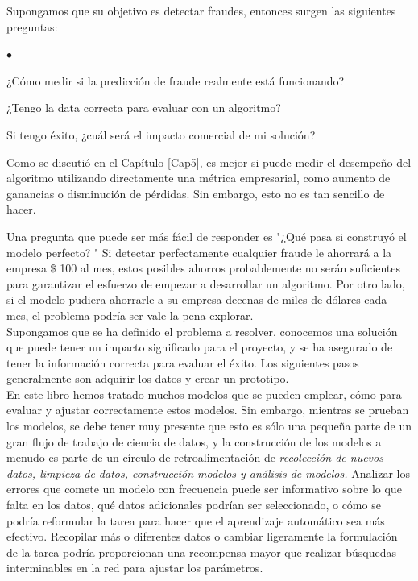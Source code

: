   Supongamos  que su objetivo es detectar fraudes, entonces surgen las siguientes preguntas:

\begin{list}{$\bullet$}{}  
	
	\item  ¿Cómo medir si la predicción de fraude realmente está funcionando?
	
	\item ¿Tengo la data correcta para evaluar con un algoritmo?
	
	\item  Si tengo éxito, ¿cuál será el impacto comercial de mi solución?
	
\end{list}

Como se discutió  en el Capítulo \ref{Cap5}, es mejor si puede medir el desempeño del
algoritmo utilizando directamente una métrica empresarial, como aumento de ganancias o disminución de pérdidas. Sin embargo, esto no es tan sencillo de hacer. 

Una pregunta que puede ser más fácil de responder es  "{}¿Qué pasa si construyó el modelo perfecto? "{} 
Si detectar perfectamente cualquier fraude le ahorrará a la empresa \$ 100 al mes, estos posibles ahorros probablemente no serán suficientes para garantizar el esfuerzo de empezar a desarrollar un algoritmo.  Por otro lado, si el modelo pudiera ahorrarle a su empresa decenas de miles de dólares cada mes, el problema podría ser vale la pena explorar.\\
	

Supongamos que se ha definido el problema a resolver, conocemos una solución  que 
puede tener un  impacto  significado   para el  proyecto, y se ha asegurado de tener
la información correcta para evaluar el éxito. Los siguientes pasos generalmente son 
adquirir los datos y crear un prototipo.\\
 
En este libro hemos tratado  muchos modelos que se pueden emplear,  cómo para evaluar y ajustar correctamente estos modelos.   Sin embargo, mientras se prueban los modelos, se debe tener muy presente  que esto es sólo una pequeña parte de un gran flujo de trabajo de ciencia de datos, y la construcción de los  modelos a menudo es parte de un círculo de retroalimentación de {\emph{ recolección  de nuevos datos, limpieza de datos, construcción modelos y análisis de  modelos.}}   
Analizar los errores que comete un modelo con frecuencia puede ser informativo sobre lo que 
falta en los datos, qué datos adicionales podrían ser seleccionado, 
o cómo se podría reformular la tarea para hacer que el aprendizaje automático sea más efectivo.
Recopilar más o diferentes datos o cambiar ligeramente la formulación de la tarea podría
proporcionan una recompensa   mayor  que realizar búsquedas interminables en la red para ajustar los parámetros.	

